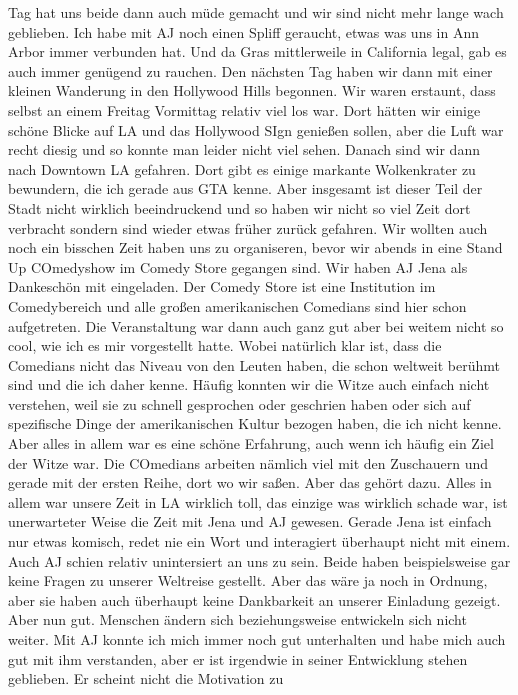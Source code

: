 \documentclass[11pt]{book}
\begin{document}
Tag hat uns beide dann auch müde gemacht und wir sind nicht mehr lange wach geblieben. Ich habe mit AJ noch einen Spliff geraucht, etwas was uns in Ann Arbor 
immer verbunden hat. Und da Gras mittlerweile in California legal, gab es auch immer genügend zu rauchen. Den nächsten Tag haben wir dann mit einer kleinen Wanderung 
in den Hollywood Hills begonnen. Wir waren erstaunt, dass selbst an einem Freitag Vormittag relativ viel los war. Dort hätten wir einige schöne Blicke auf LA 
und das Hollywood SIgn genießen sollen, aber die Luft war recht diesig und so konnte man leider nicht viel sehen. Danach sind wir dann nach Downtown LA 
gefahren. Dort gibt es einige markante Wolkenkrater zu bewundern, die ich gerade aus GTA kenne. Aber insgesamt ist dieser Teil der Stadt nicht wirklich 
beeindruckend und so haben wir nicht so viel Zeit dort verbracht sondern sind wieder etwas früher zurück gefahren. Wir wollten auch noch ein bisschen Zeit haben 
uns zu organiseren, bevor wir abends in eine Stand Up COmedyshow im Comedy Store gegangen sind. Wir haben AJ Jena als Dankeschön mit eingeladen. Der Comedy Store 
ist eine Institution im Comedybereich und alle großen amerikanischen Comedians sind hier schon aufgetreten. Die Veranstaltung war dann auch ganz gut aber 
bei weitem nicht so cool, wie ich es mir vorgestellt hatte. Wobei natürlich klar ist, dass die Comedians nicht das Niveau von den Leuten haben, die schon weltweit 
berühmt sind und die ich daher kenne. Häufig konnten wir die Witze auch einfach nicht verstehen, weil sie zu schnell gesprochen oder geschrien haben oder 
sich auf spezifische Dinge der amerikanischen Kultur bezogen haben, die ich nicht kenne. Aber alles in allem war es eine schöne Erfahrung, auch wenn ich 
häufig ein Ziel der Witze war. Die COmedians arbeiten nämlich viel mit den Zuschauern und gerade mit der ersten Reihe, dort wo wir saßen. Aber das gehört 
dazu. Alles in allem war unsere Zeit in LA wirklich toll, das einzige was wirklich schade war, ist unerwarteter Weise die Zeit mit Jena und AJ gewesen. 
Gerade Jena ist einfach nur etwas komisch, redet nie ein Wort und interagiert überhaupt nicht mit einem. Auch AJ schien relativ unintersiert an uns zu sein. 
Beide haben beispielsweise gar keine Fragen zu unserer Weltreise gestellt. Aber das wäre ja noch in Ordnung, aber sie haben auch überhaupt keine Dankbarkeit 
an unserer Einladung gezeigt. Aber nun gut. Menschen ändern sich beziehungsweise entwickeln sich nicht weiter. Mit AJ konnte ich mich immer noch gut 
unterhalten und habe mich auch gut mit ihm verstanden, aber er ist irgendwie in seiner Entwicklung stehen geblieben. Er scheint nicht die Motivation zu 
\end{document}
